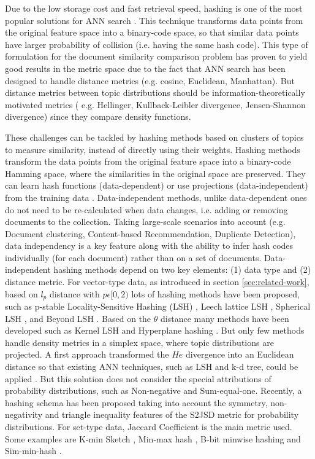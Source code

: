 Due to the low storage cost and fast retrieval speed, hashing is one of the most popular solutions for ANN search \citep{Zhen2016}. This technique transforms data points from the original feature space into a binary-code space, so that similar data points have larger probability of collision (i.e. having the same hash code). This type of formulation for the document similarity comparison problem has proven to yield good results in the metric space \citep{Krstovski2011} due to the fact that ANN search has been designed to handle distance metrics (e.g. cosine, Euclidean, Manhattan). But distance metrics between topic distributions should be information-theoretically motivated metrics ( e.g. Hellinger, Kullback-Leibler divergence, Jensen-Shannon divergence) since they compare density functions. 

These challenges can be tackled by hashing methods based on clusters of topics to measure similarity, instead of directly using their weights. Hashing methods transform the data points from the original feature space into a binary-code Hamming space, where the similarities in the original space are preserved. They can learn hash functions (data-dependent) or use projections (data-independent) from the training data \citep{Wang2016}. Data-independent methods, unlike data-dependent ones do not need to be re-calculated when data changes, i.e. adding or removing documents to the collection. Taking large-scale scenarios into account (e.g. Document clustering, Content-based Recommendation, Duplicate Detection), data independency is a key feature along with the ability to infer hash codes individually (for each document) rather than on a set of documents. Data-independent hashing methods depend on two key elements: (1) data type and (2) distance metric. For vector-type data, as introduced in section \ref{sec:related-work}, based on $l_p$ distance with $p \epsilon [0,2)$ lots of hashing methods have been proposed, such as p-stable Locality-Sensitive Hashing (LSH) \citep{Datar2004}, Leech lattice LSH \citep{Andoni2006}, Spherical LSH \citep{Terasawa2007}, and Beyond LSH \citep{Andoni2014}. Based on the $\theta$ distance many methods have been developed such as Kernel LSH \citep{Kulis2012} and Hyperplane hashing \citep{Vijayanarasimhan2014}. But only few methods handle density metrics in a simplex space, where topic distributions are projected. A first approach transformed the $He$ divergence into an Euclidean distance so that existing ANN techniques, such as LSH and k-d tree, could be applied \citep{Krstovski2013a}. But this solution does not consider the special attributions of probability distributions, such as Non-negative and Sum-equal-one. Recently, a hashing schema \citep{Mao2017} has been proposed taking into account the symmetry, non-negativity and triangle inequality features of the S2JSD metric for probability distributions. For set-type data, Jaccard Coefficient is the main metric used. Some examples are K-min Sketch \citep{Li2012}, Min-max hash \citep{Ji2013}, B-bit minwise hashing \citep{Li2010b} and Sim-min-hash \citep{Zhao2013}.

